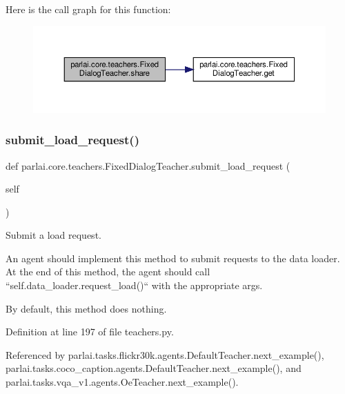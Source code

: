 Here is the call graph for this function\+:
\nopagebreak
\begin{figure}[H]
\begin{center}
\leavevmode
\includegraphics[width=350pt]{classparlai_1_1core_1_1teachers_1_1FixedDialogTeacher_af1501d26676b7cf0ed8f41d51c31e686_cgraph}
\end{center}
\end{figure}
\mbox{\label{classparlai_1_1core_1_1teachers_1_1FixedDialogTeacher_a8923ee1255939443c7a6ea1532a2fe40}} 
\subsubsection{\texorpdfstring{submit\+\_\+load\+\_\+request()}{submit\_load\_request()}}
{\footnotesize\ttfamily def parlai.\+core.\+teachers.\+Fixed\+Dialog\+Teacher.\+submit\+\_\+load\+\_\+request (\begin{DoxyParamCaption}\item[{}]{self }\end{DoxyParamCaption})}

\begin{DoxyVerb}Submit a load request.

An agent should implement this method to submit requests to the data
loader. At the end of this method, the agent should call
``self.data_loader.request_load()`` with the appropriate args.

By default, this method does nothing.
\end{DoxyVerb}
 

Definition at line 197 of file teachers.\+py.



Referenced by parlai.\+tasks.\+flickr30k.\+agents.\+Default\+Teacher.\+next\+\_\+example(), parlai.\+tasks.\+coco\+\_\+caption.\+agents.\+Default\+Teacher.\+next\+\_\+example(), and parlai.\+tasks.\+vqa\+\_\+v1.\+agents.\+Oe\+Teacher.\+next\+\_\+example().

